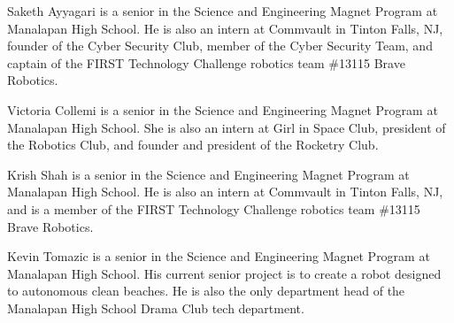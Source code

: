 \documentclass[10pt,journal,twoside]{IEEEtran}
\begin{document}



\begin{IEEEbiography}{Saketh Ayyagari} is a senior in the Science and Engineering Magnet Program at Manalapan High School. He is also an intern at Commvault in Tinton Falls, NJ, founder of the Cyber Security Club, member of the Cyber Security Team, and captain of the FIRST Technology Challenge robotics team \#13115 Brave Robotics. 
\end{IEEEbiography}

\begin{IEEEbiography}{Victoria Collemi} is a senior in the Science and Engineering Magnet Program at Manalapan High School. She is also an intern at Girl in Space Club, president of the Robotics Club, and founder and president of the Rocketry Club. 
\end{IEEEbiography}
\vfill
\newpage 
\begin{IEEEbiography}{Krish Shah} is a senior in the Science and Engineering Magnet Program at Manalapan High School. He is also an intern at Commvault in Tinton Falls, NJ, and is a member of the FIRST Technology Challenge robotics team \#13115 Brave Robotics. 
\end{IEEEbiography}

\begin{IEEEbiography}{Kevin Tomazic} is a senior in the Science and Engineering Magnet Program at Manalapan High School. His current senior project is to create a robot designed to autonomous clean beaches. He is also the only department head of the Manalapan High School Drama Club tech department. 
\end{IEEEbiography}
\vfill
\end{document}

